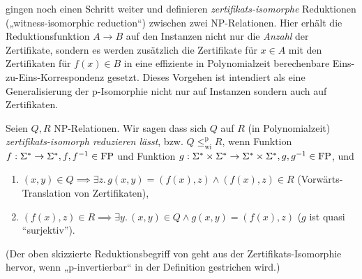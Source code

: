 \textcite{wiedermann_witness-isomorphic_1995} gingen noch einen Schritt weiter und definieren \emph{zertifikats-isomorphe} Reduktionen („witness-isomorphic reduction“) zwischen zwei NP-Relationen. Hier erhält die Reduktionsfunktion $A\to B$ auf den Instanzen nicht nur die \emph{Anzahl} der Zertifikate, sondern es werden zusätzlich die Zertifikate für $x\in A$ mit den Zertifikaten für $f(x)\in B$ in eine effiziente in Polynomialzeit berechenbare Eins-zu-Eins-Korrespondenz gesetzt. Dieses Vorgehen ist intendiert als eine Generalisierung der p-Isomorphie \parencite{berman_isomorphisms_1977} nicht nur auf Instanzen sondern auch auf Zertifikaten.

\begin{definition}\label{def:wi-reduction}
    Seien $Q, R$ NP-Relationen. Wir sagen dass sich $Q$ auf $R$ (in Polynomialzeit) \emph{zertifikats-isomorph reduzieren lässt}, bzw. $Q\leq_\mathrm{wi}^\mathrm p R$, wenn Funktion $f:\Sigma^*\to\Sigma^*, f, f^{-1}\in \mathrm{FP}$ und Funktion $g:\Sigma^*\times\Sigma^*\to\Sigma^*\times\Sigma^*, g, g^{-1}\in\mathrm{FP}$, und
    \begin{enumerate}
        \item $(x,y)\in Q \implies \exists z.\,g(x,y) = (f(x), z) \land (f(x), z)\in R$ (Vorwärts-Translation von Zertifikaten),
        \item $(f(x),z)\in R \implies \exists y.\, (x,y)\in Q\land g(x,y)=(f(x), z)$ ($g$ ist quasi “surjektiv”). \qedhere
    \end{enumerate}
\end{definition}
(Der oben skizzierte Reduktionsbegriff von \textcite{lynch_structure_1978} geht aus der Zertifikats-Isomorphie hervor, wenn „p-invertierbar“ in der Definition gestrichen wird.)

